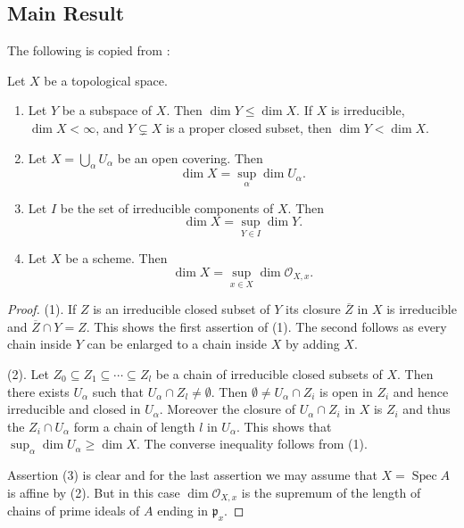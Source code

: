 \subsection{Main Result}

The following is copied from \cite[Lemma 5.7]{Gortz_Wedhorn_2nd_Ed}:
\begin{lemma}
\label{thm_scheme_dim}
Let $X$ be a topological space.
\begin{enumerate}
    \item Let $Y$ be a subspace of $X$. Then $\dim Y \leq \dim X$. If $X$ is irreducible, $\dim X < \infty$, and $Y \subsetneq X$ is a proper closed subset, then $\dim Y < \dim X$.

    \item Let $X = \bigcup_{\alpha} U_{\alpha}$ be an open covering. Then
    \[\dim X = \sup_{\alpha} \dim U_{\alpha}.\]

    \item Let $I$ be the set of irreducible components of $X$. Then
    \[\dim X = \sup_{Y \in I} \dim Y.\]

    \item Let $X$ be a scheme. Then
    \[\dim X = \sup_{x \in X} \dim \mathcal{O}_{X,x}.\]
\end{enumerate}
\end{lemma}

\begin{proof}
(1). If $Z$ is an irreducible closed subset of $Y$ its closure $\overline{Z}$ in $X$ is irreducible and $\overline{Z} \cap Y = Z$. This shows the first assertion of (1). The second follows as every chain inside $Y$ can be enlarged to a chain inside $X$ by adding $X$.

(2). Let $Z_0 \subseteq Z_1 \subseteq \cdots \subseteq Z_l$ be a chain of irreducible closed subsets of $X$. Then there exists $U_{\alpha}$ such that $U_{\alpha} \cap Z_l \neq \emptyset$. Then $\emptyset \neq U_{\alpha} \cap Z_i$ is open in $Z_i$ and hence irreducible and closed in $U_{\alpha}$. Moreover the closure of $U_{\alpha} \cap Z_i$ in $X$ is $Z_i$ and thus the $Z_i \cap U_{\alpha}$ form a chain of length $l$ in $U_{\alpha}$. This shows that $\sup_{\alpha} \dim U_{\alpha} \geq \dim X$. The converse inequality follows from (1).

Assertion (3) is clear and for the last assertion we may assume that $X = \operatorname{Spec} A$ is affine by (2). But in this case $\dim \mathcal{O}_{X,x}$ is the supremum of the length of chains of prime ideals of $A$ ending in $\mathfrak{p}_x$.
\end{proof}
